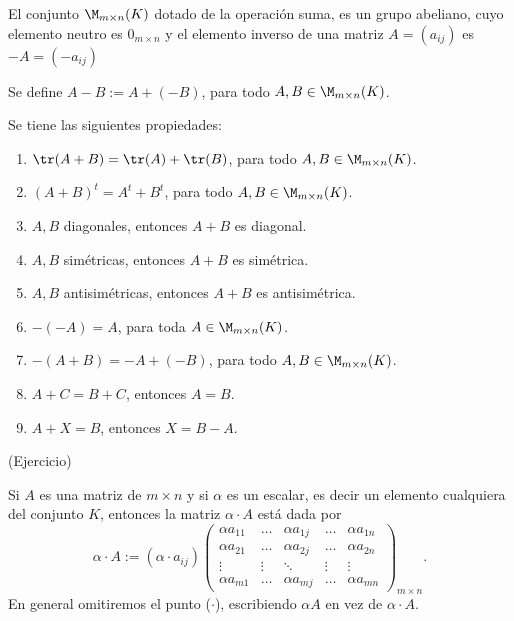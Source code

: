 \begin{thm}
El conjunto $\M_{m\times n}(K)$ dotado de la operaci\'on suma, es un grupo abeliano, cuyo elemento neutro es $0_{m\times n}$ y el elemento inverso de una matriz $A=(a_{ij})$ es $-A=(-a_{ij})$
\end{thm}

Se define $A - B := A + (-B)$, para todo $ A, B \in \M_{m\times n}(K)$.

\begin{thm}
Se tiene las siguientes propiedades:
\begin{enumerate}
    \item $\tr(A+B) = \tr(A) + \tr(B)$, para todo $ A, B \in \M_{m\times n}(K)$.
    \item $(A + B)^t = A^t + B^t$, para todo $ A, B \in \M_{m\times n}(K)$.
    \item $A, B$ diagonales, entonces $A + B$ es diagonal.
    \item $A, B$ simétricas, entonces $A + B$ es simétrica.
    \item $A, B$ antisimétricas, entonces $A + B$ es antisimétrica.
    \item $- ( -A) = A$, para toda $ A \in \M_{m\times n}(K)$.
    \item $-(A + B) = -A + (-B)$, para todo $ A, B \in \M_{m\times n}(K)$.
    \item $ A + C = B + C$, entonces  $A = B$.
    \item $ A + X = B$, entonces $X = B - A$.
\end{enumerate}
\end{thm}
\proof (Ejercicio)


\begin{defin}
Si $A$ es una matriz de $m \times n$ y si $\alpha$ es un escalar, es decir un elemento cualquiera del conjunto $K$, entonces la matriz $\alpha \cdot A$ está dada por
\[\alpha \cdot A:=(\alpha \cdot a_{ij})\left(\begin{array}{ccccc}
     \alpha a_{11} & \dots &\alpha  a_{1j} &\dots &\alpha  a_{1n}\\
     \alpha a_{21} & \dots &\alpha  a_{2j} &\dots &\alpha  a_{2n}\\
     \vdots&  \vdots & \ddots &  \vdots &\vdots \\
     \alpha a_{m1} & \dots &\alpha  a_{mj} &\dots &\alpha  a_{mn}
\end{array}\right)_{m\times n}.\]
En general omitiremos el punto ($\cdot$), escribiendo $\alpha A$ en vez de $\alpha \cdot A$.
\end{defin}

